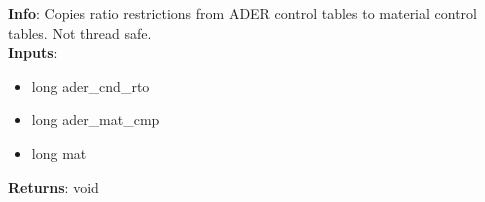 \textbf{Info}: Copies ratio restrictions from ADER control tables to material
control tables. Not thread safe.\\

\noindent \textbf{Inputs}:
\begin{itemize}
\item{long ader\_cnd\_rto}
\item{long ader\_mat\_cmp}
\item{long mat}
\end{itemize}

\noindent \textbf{Returns}: void

